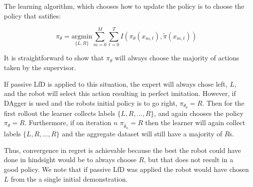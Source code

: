 \documentclass[10pt, conference]{ieeeconf}      %
\begin{document}
The learning algorithm, which chooses how to update the policy is to choose the policy that satifies: 

$$\pi_{\theta} = \underset{\lbrace L,R \rbrace}{\mbox{argmin}} \sum^M_{m=0}\sum^T_{t=0} I(\pi_\theta(x_{m,t}),\tilde{\pi}(x_{m,t}))$$

It is straightforward to show that $\pi_{\theta}$ will always choose the majority of actions taken by the supervisor.

If passive LfD is applied to this situation, the expert will always chose left, $L$, and the robot will select this action resulting in perfect imitation. However, if DAgger is used and the robots initial policy is to go right, $\pi_{\theta_0} = R$.
Then for the first rollout the learner collects labels $\{L, R, ..., R\}$, and again chooses the policy $\pi_{\theta} = R$.
Furthermore, if on iteration $n$ $\pi_{\hat{\theta}_n} = R$ then the learner will again collect labels $\{L, R, ..., R\}$ and the aggregate dataset will still have a majority of $R$s.

Thus, convergence in regret is achievable because the best the robot could have done in hindsight would be to always choose $R$, but that does not result in a good policy. We note that if passive LfD was applied the robot would have chosen $L$ from the a single initial demonstration. 
\end{document}
